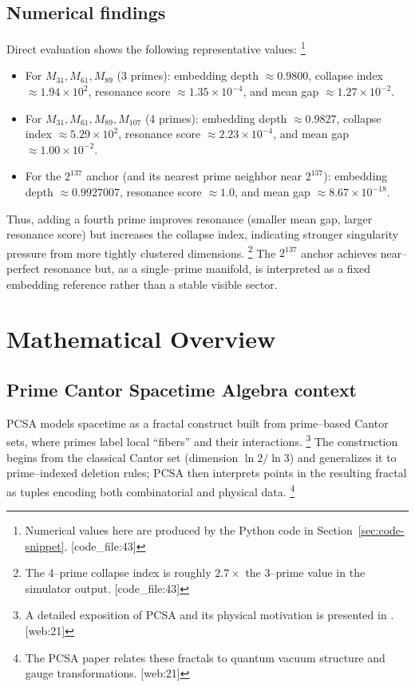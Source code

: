 \documentclass[11pt]{article}
\begin{document}
\subsection{Numerical findings}

Direct evaluation shows the following representative values:%
\footnote{Numerical values here are produced by the Python code in Section~\ref{sec:code-snippet}. [code\_file:43]} 

\begin{itemize}
  \item For $M_{31},M_{61},M_{89}$ (3 primes): 
  embedding depth $\approx 0.9800$, collapse index $\approx 1.94\times 10^2$, resonance score $\approx 1.35\times 10^{-4}$, and mean gap $\approx 1.27\times 10^{-2}$.
  \item For $M_{31},M_{61},M_{89},M_{107}$ (4 primes):
  embedding depth $\approx 0.9827$, collapse index $\approx 5.29\times 10^2$, resonance score $\approx 2.23\times 10^{-4}$, and mean gap $\approx 1.00\times 10^{-2}$.
  \item For the $2^{137}$ anchor (and its nearest prime neighbor near $2^{137}$):
  embedding depth $\approx 0.9927007$, resonance score $\approx 1.0$, and mean gap $\approx 8.67\times 10^{-18}$.
\end{itemize}

Thus, adding a fourth prime improves resonance (smaller mean gap, larger resonance score) but increases the collapse index, indicating stronger singularity pressure from more tightly clustered dimensions.%
\footnote{The 4--prime collapse index is roughly $2.7\times$ the 3--prime value in the simulator output. [code\_file:43]} 
The $2^{137}$ anchor achieves near--perfect resonance but, as a single--prime manifold, is interpreted as a fixed embedding reference rather than a stable visible sector.

\section{Mathematical Overview}

\subsection{Prime Cantor Spacetime Algebra context}

PCSA models spacetime as a fractal construct built from prime--based Cantor sets, where primes label local ``fibers'' and their interactions.%
\footnote{A detailed exposition of PCSA and its physical motivation is presented in \cite{pcsa_gist}. [web:21]} 
The construction begins from the classical Cantor set (dimension $\ln 2/\ln 3$) and generalizes it to prime--indexed deletion rules; PCSA then interprets points in the resulting fractal as tuples encoding both combinatorial and physical data.%
\footnote{The PCSA paper relates these fractals to quantum vacuum structure and gauge transformations. [web:21]} 
\end{document}
